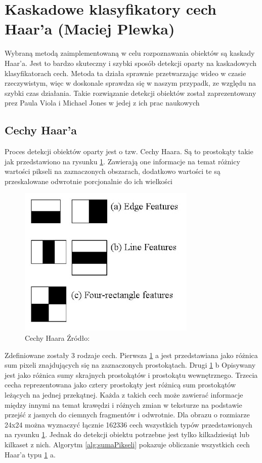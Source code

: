 \section{Kaskadowe klasyfikatory cech Haar'a (Maciej Plewka)}

Wybraną metodą zaimplementowaną w celu rozpoznawania obiektów są kaskady Haar'a. Jest to bardzo skuteczny i szybki sposób detekcji oparty na kaskadowych klasyfikatorach cech. Metoda ta działa sprawnie przetwarzając wideo w czasie rzeczywistym, więc w doskonale sprawdza się w naszym przypadk, ze względu na szybki czas działania. Takie rozwiązanie detekcji obiektów został zaprezentowany prez Paula Viola i Michael Jones w jedej z ich prac naukowych \cite{violaJones}

\subsection{Cechy Haar'a}
Proces detekcji obiektów oparty jest o tzw. Cechy Haara. Są to prostokąty takie jak przedstawiono na rysunku \ref{fig:cechyHaara}. Zawierają one informacje na temat różnicy wartości pikseli na zaznaczonych obszarach, dodatkowo wartości te są przeskalowane odwrotnie porcjonalnie do ich wielkości
\begin{figure}[H]
\centering
\includegraphics[scale=0.5]{imgs/cechy.jpg}
\caption{{Cechy Haara Źródło:} \cite{faceDetectionOpenCV}}
\label{fig:cechyHaara}
\end{figure}

Zdefiniowane zostały 3 rodzaje cech. Pierwsza \ref{fig:cechyHaara} a jest przedstawiana jako różnica sum pixeli znajdujących się na zaznaczonych prostokątach. Drugi \ref{fig:cechyHaara} b  Opisywany jest jako różnica sumy skrajnych prostokątów i prostokątu wewnętrznego. Trzecia cecha reprezentowana jako cztery prostokąty jest różnicą sum prostokątów leżących na jednej przekątnej. Każda z takich cech może zawierać informacje między innymi na temat krawędzi i różnych zmian w teksturze na podstawie przejść z jasnych do ciemnych fragmentów i odwrotnie. Dla obrazu o rozmiarze 24x24 można wyznaczyć łącznie 162336 cech wszystkich typów przedstawionych na rysunku \ref{fig:cechyHaara}. Jednak do detekcji obiektu potrzebne jest tylko kilkadziesiąt lub kilkaset z nich. Algorytm \ref{alg:sumaPikseli} pokazuje obliczanie wszystkich cech Haar'a typu \ref{fig:cechyHaara} a.

